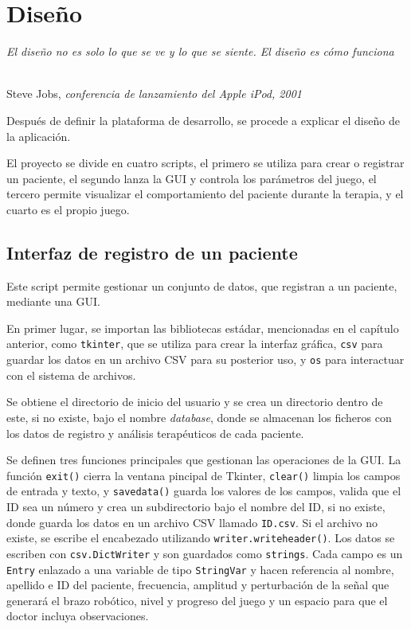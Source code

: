 \chapter{Diseño}
\label{cap:capitulo4}

\begin{flushright}
\begin{minipage}[]{9cm}
\emph{El diseño no es solo lo que se ve y lo que se siente. El diseño es cómo funciona}\\
\end{minipage}\\

Steve Jobs, \textit{conferencia de lanzamiento del Apple iPod, 2001}\\
\end{flushright}

\vspace{1cm}

Después de definir la plataforma de desarrollo, se procede a explicar el diseño de la aplicación.

El proyecto se divide en cuatro scripts, el primero se utiliza para crear o registrar un paciente, el segundo lanza la GUI y controla los parámetros del juego, el tercero permite visualizar el comportamiento del paciente durante la terapia, y el cuarto es el propio juego.

\section{Interfaz de registro de un paciente}
\label{section:registro}

Este script permite gestionar un conjunto de datos, que registran a un paciente, mediante una GUI.

En primer lugar, se importan las bibliotecas estádar, mencionadas en el capítulo anterior, como \verb|tkinter|, que se utiliza para crear la interfaz gráfica, \verb|csv| para guardar los datos en un archivo CSV para su posterior uso, y \verb|os| para interactuar con el sistema de archivos.

Se obtiene el directorio de inicio del usuario y se crea un directorio dentro de este, si no existe, bajo el nombre \textit{database}, donde se almacenan los ficheros con los datos de registro y análisis terapéuticos de cada paciente.

Se definen tres funciones principales que gestionan las operaciones de la GUI.
La función \verb|exit()| cierra la ventana pincipal de Tkinter, \verb|clear()| limpia los campos de entrada y texto, y \verb|savedata()| guarda los valores de los campos, valida que el ID sea un número y crea un subdirectorio bajo el nombre del ID, si no existe, donde guarda los datos en un archivo CSV llamado \verb|ID.csv|.
Si el archivo no existe, se escribe el encabezado utilizando \verb|writer.writeheader()|.
Los datos se escriben con \verb|csv.DictWriter| y son guardados como \verb|strings|.
Cada campo es un \verb|Entry| enlazado a una variable de tipo \verb|StringVar| y hacen referencia al nombre, apellido e ID del paciente, frecuencia, amplitud y perturbación de la señal que generará el brazo robótico, nivel y progreso del juego y un espacio para que el doctor incluya observaciones.

